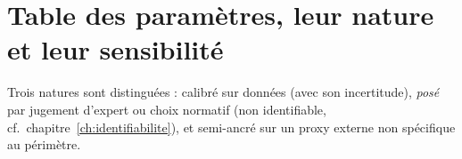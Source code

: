 %
%
%
%

\chapter{Table des paramètres, leur nature et leur sensibilité}
\label{sec:ann-parametres}

Trois natures sont distinguées : calibré sur données (avec son incertitude),
\emph{posé} par jugement d'expert ou choix normatif (non identifiable, cf.\
chapitre~\ref{ch:identifiabilite}), et semi-ancré sur un proxy externe non
spécifique au périmètre.


